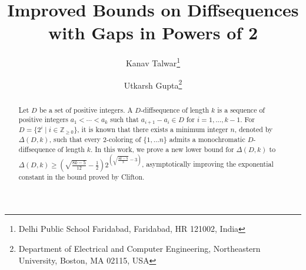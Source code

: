 \documentclass[11pt]{article}
\title{Improved Bounds on  Diffsequences with Gaps in Powers of 2}
\author{Kanav Talwar\thanks{
                  Delhi Public School Faridabad, Faridabad, HR 121002, India}
        \and
        Utkarsh Gupta\thanks{
                      Department of Electrical and Computer Engineering, Northeastern University, Boston, MA 02115, USA
                  }
        }
\newenvironment{AMS}{}{}
\newenvironment{keywords}{}{}
\begin{document}
\newpage
\maketitle
\begin{abstract}
    Let $D$ be a set of positive integers. A $D$-diffsequence of length $k$ is a sequence of positive integers $a_1 <  \cdots < a_k$ such that $a_{i+1}-a_i\in D$ for $i=1,\ldots,k-1$. For $D=\{2^i\mid i\in \mathbb{Z}_{\ge 0}\}$, it is known that there exists a minimum integer $n$, denoted by $\Delta(D,k)$, such that every $2$-coloring of $\{1,\ldots n \}$ admits a monochromatic $D$-diffsequence of length $k$. In this work, we prove a new lower bound for $\Delta(D,k)$ to $\Delta(D,k)\ge \left(\sqrt{\frac{8k-5}{12}}-\frac12\right)2^{\left(\sqrt{\frac{8k-5}{3}}-3\right)}$, asymptotically improving the exponential constant in the bound proved by Clifton.
\end{abstract}



\end{document}
